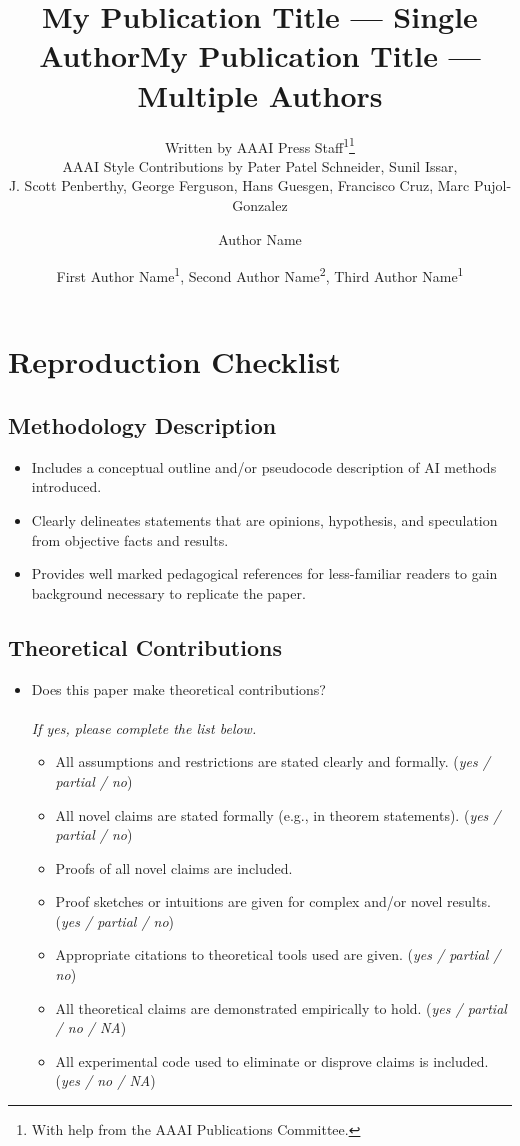 \documentclass[letterpaper]{article} %
\author{
    Written by AAAI Press Staff\textsuperscript{\rm 1}\thanks{With help from the AAAI Publications Committee.}\\
    AAAI Style Contributions by Pater Patel Schneider,
    Sunil Issar,\\
    J. Scott Penberthy,
    George Ferguson,
    Hans Guesgen,
    Francisco Cruz\equalcontrib,
    Marc Pujol-Gonzalez\equalcontrib
}
\title{My Publication Title --- Single Author}
\author {
    Author Name
}
\title{My Publication Title --- Multiple Authors}
\author {
    First Author Name\textsuperscript{\rm 1},
    Second Author Name\textsuperscript{\rm 2},
    Third Author Name\textsuperscript{\rm 1}
}
\begin{document}
\section*{Reproduction Checklist}
\subsection*{Methodology Description}
\begin{itemize}
    \item Includes a conceptual outline and/or pseudocode description of AI methods introduced. \\ 
    \item Clearly delineates statements that are opinions, hypothesis, and speculation from objective facts and results. \\ 
    \item Provides well marked pedagogical references for less-familiar readers to gain background necessary to replicate the paper. \leavevmode \hfill{}
\end{itemize}

\subsection*{Theoretical Contributions}
\begin{itemize}
    \item Does this paper make theoretical contributions? \\
      \\
    \textit{If yes, please complete the list below.}
    \begin{itemize}
        \item All assumptions and restrictions are stated clearly and formally. \hfill (\textit{yes / partial / no})
        \item All novel claims are stated formally (e.g., in theorem statements). \hfill (\textit{yes / partial / no})
        \item Proofs of all novel claims are included. \\ 
        \item Proof sketches or intuitions are given for complex and/or novel results. \hfill (\textit{yes / partial / no})
        \item Appropriate citations to theoretical tools used are given. \hfill (\textit{yes / partial / no})
        \item All theoretical claims are demonstrated empirically to hold. \hfill (\textit{yes / partial / no / NA})
        \item All experimental code used to eliminate or disprove claims is included. \hfill (\textit{yes / no / NA})
    \end{itemize}
\end{itemize}
\end{document}
